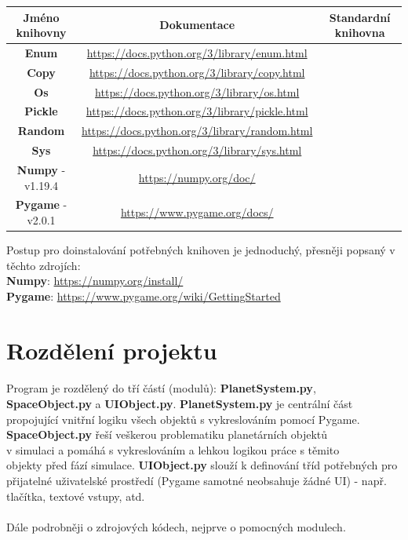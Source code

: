 \documentclass[a4paper, 12pt]{article}
\newcommand{\cmark}{\ding{51}}
\newcommand{\xmark}{\ding{55}}
\begin{document}
\begin{table}[h!]
\centering
\hspace*{-1.5cm}
\begin{tabular}{ |c|c|c| }
 \hline
 Jméno knihovny & Dokumentace & Standardní knihovna\\
 \hline
 \textbf{Enum} & \url{https://docs.python.org/3/library/enum.html} & \cmark\\
 \hline
 \textbf{Copy} & \url{https://docs.python.org/3/library/copy.html} & \cmark\\
 \hline
 \textbf{Os} & \url{https://docs.python.org/3/library/os.html} & \cmark\\
 \hline
 \textbf{Pickle} & \url{https://docs.python.org/3/library/pickle.html} & \cmark\\
 \hline
 \textbf{Random} & \url{https://docs.python.org/3/library/random.html} & \cmark\\
 \hline
 \textbf{Sys} & \url{https://docs.python.org/3/library/sys.html} & \cmark\\
 \hline
 \textbf{Numpy} - v1.19.4 & \url{https://numpy.org/doc/} & \xmark\\
 \hline
 \textbf{Pygame} - v2.0.1 & \url{https://www.pygame.org/docs/} & \xmark\\
 \hline
\end{tabular}
\end{table}

Postup pro doinstalování potřebných knihoven je jednoduchý, přesněji popsaný v
těchto zdrojích:\\
\textbf{Numpy}: \url{https://numpy.org/install/}\\
\textbf{Pygame}: \url{https://www.pygame.org/wiki/GettingStarted}\\

\section{Rozdělení projektu}
\paragraph{}
Program je rozdělený do tří částí (modulů): \textbf{PlanetSystem.py},
\\\textbf{SpaceObject.py} a \textbf{UIObject.py}. \textbf{PlanetSystem.py} je
centrální část propojující vnitřní logiku všech objektů s vykreslováním pomocí
Pygame.  \textbf{SpaceObject.py} řeší veškerou problematiku planetárních
objektů \\v simulaci a pomáhá s vykreslováním a lehkou logikou práce s těmito
\\objekty před fází simulace.  \textbf{UIObject.py} slouží k definování tříd
potřebných pro přijatelné uživatelské prostředí (Pygame samotné neobsahuje
žádné UI) - např.  tlačítka, textové vstupy, atd.\\\\
Dále podrobněji o zdrojových kódech, nejprve o pomocných modulech.
\end{document}
